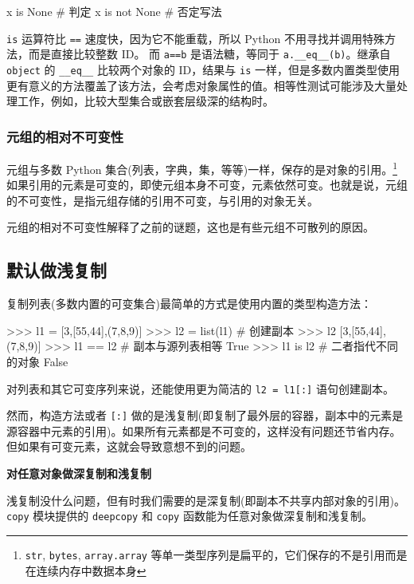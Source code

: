 \begin{python}
x is None       # 判定
x is not None   # 否定写法
\end{python}

\texttt{is} 运算符比 \texttt{==} 速度快，因为它不能重载，所以 Python 不用寻找并调用特殊方法，而是直接比较整数 ID。 而 \texttt{a==b} 是语法糖，等同于 \texttt{a.\_\_eq\_\_(b)}。继承自 \texttt{object} 的 \texttt{\_\_eq\_\_} 比较两个对象的 ID，结果与 \texttt{is} 一样，但是多数内置类型使用更有意义的方法覆盖了该方法，会考虑对象属性的值。相等性测试可能涉及大量处理工作，例如，比较大型集合或嵌套层级深的结构时。

\subsubsection{元组的相对不可变性}

元组与多数 Python 集合(列表，字典，集，等等)一样，保存的是对象的引用。\footnote{\texttt{str}, \texttt{bytes}, \texttt{array.array} 等单一类型序列是扁平的，它们保存的不是引用而是在连续内存中数据本身}如果引用的元素是可变的，即使元组本身不可变，元素依然可变。也就是说，元组的不可变性，是指元组存储的引用不可变，与引用的对象无关。

元组的相对不可变性解释了之前的谜题，这也是有些元组不可散列的原因。

\subsection{默认做浅复制}

复制列表(多数内置的可变集合)最简单的方式是使用内置的类型构造方法：

\begin{python}
>>> l1 = [3,[55,44],(7,8,9)]
>>> l2 = list(l1)       # 创建副本
>>> l2
[3,[55,44],(7,8,9)]
>>> l1 == l2            # 副本与源列表相等
True
>>> l1 is l2            # 二者指代不同的对象
False
\end{python}

对列表和其它可变序列来说，还能使用更为简洁的 \texttt{l2 = l1[:]} 语句创建副本。

然而，构造方法或者 \texttt{[:]} 做的是浅复制(即复制了最外层的容器，副本中的元素是源容器中元素的引用)。如果所有元素都是不可变的，这样没有问题还节省内存。但如果有可变元素，这就会导致意想不到的问题。



\noindent\textbf{对任意对象做深复制和浅复制}

浅复制没什么问题，但有时我们需要的是深复制(即副本不共享内部对象的引用)。 \texttt{copy} 模块提供的 \texttt{deepcopy} 和 \texttt{copy} 函数能为任意对象做深复制和浅复制。

